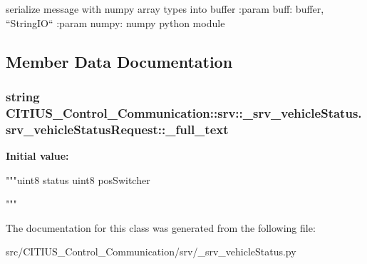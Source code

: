 \begin{DoxyVerb}
serialize message with numpy array types into buffer
:param buff: buffer, ``StringIO``
:param numpy: numpy python module
\end{DoxyVerb}
 

\subsection{\-Member \-Data \-Documentation}
\hypertarget{class_c_i_t_i_u_s___control___communication_1_1srv_1_1__srv__vehicle_status_1_1srv__vehicle_status_request_a95cd462c9ea5b2615043a9489e39e7f7}{
\subsubsection[{\-\_\-full\-\_\-text}]{\setlength{\rightskip}{0pt plus 5cm}string \-C\-I\-T\-I\-U\-S\-\_\-\-Control\-\_\-\-Communication\-::srv\-::\-\_\-srv\-\_\-vehicle\-Status.\-srv\-\_\-vehicle\-Status\-Request\-::\-\_\-full\-\_\-text}}\label{class_c_i_t_i_u_s___control___communication_1_1srv_1_1__srv__vehicle_status_1_1srv__vehicle_status_request_a95cd462c9ea5b2615043a9489e39e7f7}
{\bfseries \-Initial value\-:}
\begin{DoxyCode}
"""uint8 status
uint8 posSwitcher

"""
\end{DoxyCode}


\-The documentation for this class was generated from the following file\-:\begin{DoxyCompactItemize}
\item 
src/\-C\-I\-T\-I\-U\-S\-\_\-\-Control\-\_\-\-Communication/srv/\-\_\-srv\-\_\-vehicle\-Status.\-py\end{DoxyCompactItemize}
